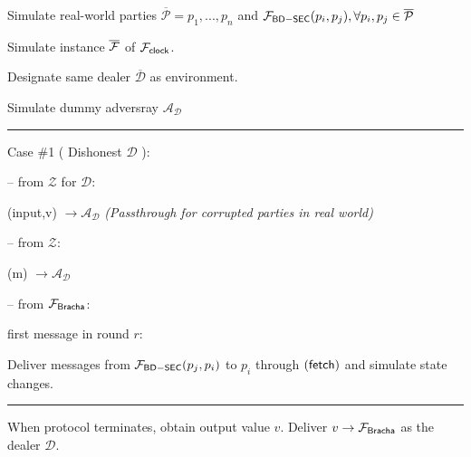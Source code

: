 %
%
%
%
%
%
%
%
%
%
%
%
%
%
%
%
\begin{bbox}[title={Simulator $S_{\msf{Bracha}}$}]

Simulate real-world parties $\overline{\mathcal{P}} = p_1,...,p_n$ and $\mathcal{F}_{{\mathsf {BD-SEC}}}(p_i,p_j), \forall p_i,p_j \in \overline{\mathcal{P}}$

Simulate instance $\overline{\mathcal{F}}$ of $\mathcal{F}_{{\mathsf {clock}}}$.

Designate same dealer $\overline{\mathcal{D}}$ as environment.

Simulate dummy adversray $\mathcal{A}_{\mathcal{D}}$

\vspace{2mm} \hrule \vspace{2mm}

Case \#1 ( Dishonest $\mathcal{D}$ ):

-- \OnInput {} from $\mathcal{Z}$ for $\mathcal{D}$:

	\dquad \Send (input,v) $\rightarrow \mathcal{A}_{\mathcal{D}}$ {\em (Passthrough for corrupted parties in real world)}

-- \OnInput {} from $\mathcal{Z}$:

	\dquad \Send (m) $\rightarrow \mathcal{A}_{\mathcal{D}}$

-- \OnInput {} from $\mathcal{F}_{{\mathsf {Bracha}}}$:

	\dquad \If first message in round $r$:

		\dquad \quad Deliver messages from $\mathcal{F}_{{\mathsf {BD-SEC}}}(p_j,p_i)$ to $p_i$ through $({\mathsf {fetch}})$ and simulate state changes.

\vspace{2mm} \hrule \vspace{2mm}

When protocol terminates, obtain output value $v$. Deliver $v \rightarrow \mathcal{F}_{{\mathsf {Bracha}}}$ as the dealer $\mathcal{D}$.

\end{bbox}
